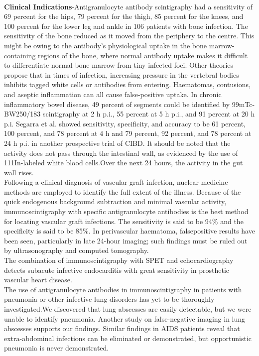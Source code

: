 \documentclass[12pt]{article}
\begin{document}
\\\textbf{Clinical Indications}-Antigranulocyte antibody scintigraphy had a sensitivity of 69 percent for the hips, 79 percent for the thigh, 85 percent for the knees, and 100 percent for the lower leg and ankle in 106 patients with bone infection. The sensitivity of the bone reduced as it moved from the periphery to the centre. This might be owing to the antibody's physiological uptake in the bone marrow-containing regions of the bone, where normal antibody uptake makes it difficult to differentiate normal bone marrow from tiny infected foci. Other theories propose that in times of infection, increasing pressure in the vertebral bodies inhibits tagged white cells or antibodies from entering.
Haematomas, contusions, and aseptic inflammation can all cause false-positive uptake. In chronic inflammatory bowel disease, 49 percent of segments could be identified by 99mTc- BW250/183 scintigraphy at 2 h p.i., 55 percent at 5 h p.i., and 91 percent at 20 h p.i. Segarra et al. showed sensitivity, specificity, and accuracy to be 61 percent, 100 percent, and 78 percent at 4 h and 79 percent, 92 percent, and 78 percent at 24 h p.i. in another prospective trial of CIBD. It should be noted that the activity does not pass through the intestinal wall, as evidenced by the use of 111In-labeled white blood cells.Over the next 24 hours, the activity in the gut wall rises.
\\Following a clinical diagnosis of vascular graft infection, nuclear medicine methods are employed to identify the full extent of the illness. Because of the quick endogenous background subtraction and minimal vascular activity, immunoscintigraphy with specific antigranulocyte antibodies is the best method for locating vascular graft infections. The sensitivity is said to be 94$\%$ and the specificity is said to be 85$\%$. In perivascular haematoma, falsepositive results have been seen, particularly in late 24-hour imaging; such findings must be ruled out by ultrasonography and computed tomography.
\\The combination of immunoscintigraphy with SPET and echocardiography detects subacute infective endocarditis with great sensitivity in prosthetic vascular heart disease.
\\The use of antigranulocyte antibodies in immunoscintigraphy in patients with pneumonia or other infective lung disorders has yet to be thoroughly investigated.We discovered that lung abscesses are easily detectable, but we were unable to identify pneumonia. Another study on false-negative imaging in lung abscesses supports our findings. Similar findings in AIDS patients reveal that extra-abdominal infections can be eliminated or demonstrated, but opportunistic pneumonia is never demonstrated.
\end{document}
